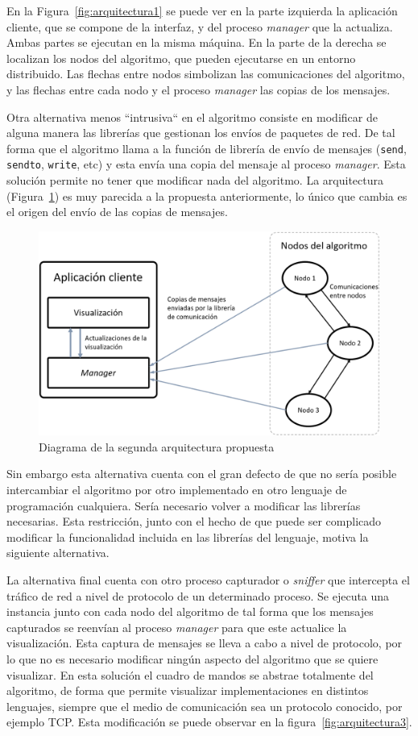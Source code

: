 En la Figura~\ref{fig:arquitectura1} se puede ver en la parte izquierda la aplicación cliente, que se compone de la interfaz, y del proceso \textit{manager} que la actualiza. Ambas partes se ejecutan en la misma máquina. En la parte de la derecha se localizan los nodos del algoritmo, que pueden ejecutarse en un entorno distribuido. Las flechas entre nodos simbolizan las comunicaciones del algoritmo, y las flechas entre cada nodo y el proceso \textit{manager} las copias de los mensajes.

Otra alternativa menos ``intrusiva`` en el algoritmo consiste en modificar de alguna manera las librerías que gestionan los envíos de paquetes de red. De tal forma que el algoritmo llama a la función de librería de envío de mensajes (\texttt{send}, \texttt{sendto}, \texttt{write}, etc) y esta envía una copia del mensaje al proceso \textit{manager}. Esta solución permite no tener que modificar nada del algoritmo. La arquitectura (Figura~\ref{fig:arquitectura2}) es muy parecida a la propuesta anteriormente, lo único que cambia es el origen del envío de las copias de mensajes.

\begin{figure}[h]
  \centering
  \includegraphics[width=0.7\linewidth]{imagenes/arquitectura2}
  \caption{Diagrama de la segunda arquitectura propuesta}
  \label{fig:arquitectura2}
\end{figure}

\newpage

Sin embargo esta alternativa cuenta con el gran defecto de que no sería posible intercambiar el algoritmo por otro implementado en otro lenguaje de programación cualquiera. Sería necesario volver a modificar las librerías necesarias. Esta restricción, junto con el hecho de que puede ser complicado modificar la funcionalidad incluida en las librerías del lenguaje, motiva la siguiente alternativa.

La alternativa final cuenta con otro proceso capturador o \textit{sniffer} que intercepta el tráfico de red a nivel de protocolo de un determinado proceso. Se ejecuta una instancia junto con cada nodo del algoritmo de tal forma que los mensajes capturados se reenvían al proceso \textit{manager} para que este actualice la visualización. Esta captura de mensajes se lleva a cabo a nivel de protocolo, por lo que no es necesario modificar ningún aspecto del algoritmo que se quiere visualizar. En esta solución el cuadro de mandos se abstrae totalmente del algoritmo, de forma que permite visualizar implementaciones en distintos lenguajes, siempre que el medio de comunicación sea un protocolo conocido, por ejemplo TCP. Esta modificación se puede observar en la figura~\ref{fig:arquitectura3}.

